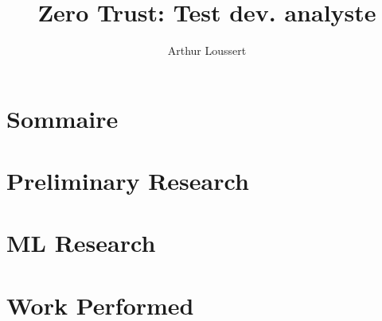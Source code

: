 \documentclass[compress]{beamer}
\title{Zero Trust: Test dev. analyste}
\author{Arthur Loussert}
\begin{document}
\frame{\titlepage}

\section*{Sommaire}
\begin{frame}
    \tableofcontents[hideothersubsections]
\end{frame}

\section{Preliminary Research}
    

\section{ML Research}
    

\section{Work Performed}
    
\end{document}
